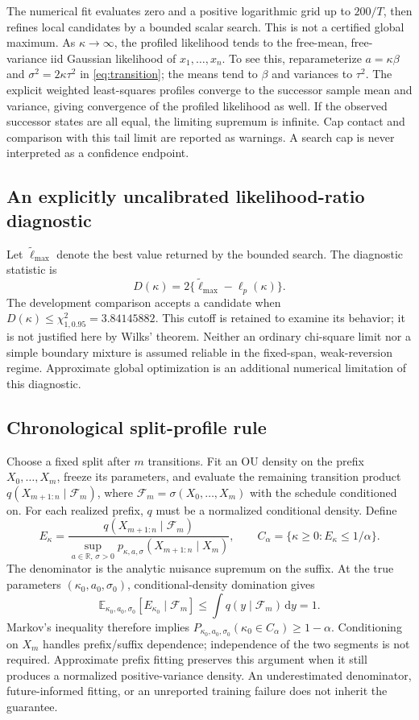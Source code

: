 \documentclass[11pt]{article}
\newcommand{\E}{\mathbb E}
\newcommand{\R}{\mathbb R}
\newcommand{\D}{\mathrm d}
\begin{document}
The numerical fit evaluates zero and a positive logarithmic grid up to $200/T$, then refines
local candidates by a bounded scalar search. This is not a certified global
maximum. As $\kappa\to\infty$, the profiled likelihood tends to the free-mean,
free-variance iid Gaussian likelihood of $x_1,\ldots,x_n$. To see this,
reparameterize $a=\kappa\beta$ and $\sigma^2=2\kappa\tau^2$ in
\eqref{eq:transition}; the means tend to $\beta$ and variances to $\tau^2$.
The explicit weighted least-squares profiles converge to the successor sample
mean and variance, giving convergence of the profiled likelihood as well.
If the observed successor states are all equal, the limiting supremum is
infinite. Cap contact and comparison with this tail limit are reported as
warnings. A search cap is never interpreted as a confidence endpoint.

\subsection{An explicitly uncalibrated likelihood-ratio diagnostic}
Let $\widetilde\ell_{\max}$ denote the best value returned by the bounded
search. The diagnostic statistic is
\[
 D(\kappa)=2\{\widetilde\ell_{\max}-\ell_p(\kappa)\}.
\]
The development comparison accepts a candidate when
$D(\kappa)\leq\chi^2_{1,0.95}=3.84145882$. This cutoff is retained to examine
its behavior; it is not justified here by Wilks' theorem. Neither an ordinary
chi-square limit nor a simple boundary mixture is assumed reliable in the
fixed-span, weak-reversion regime. Approximate global optimization is an
additional numerical limitation of this diagnostic.

\subsection{Chronological split-profile rule}
Choose a fixed split after $m$ transitions. Fit an OU density on the prefix
$X_0,\ldots,X_m$, freeze its parameters, and evaluate the remaining transition
product $q(X_{m+1:n}\mid\mathcal F_m)$, where
$\mathcal F_m=\sigma(X_0,\ldots,X_m)$ with the schedule conditioned on.
For each realized prefix, $q$ must be a normalized conditional density. Define
\begin{equation}
 E_\kappa=
 \frac{q(X_{m+1:n}\mid\mathcal F_m)}
 {\sup_{a\in\R,\,\sigma>0}
 p_{\kappa,a,\sigma}(X_{m+1:n}\mid X_m)},
 \qquad
 C_\alpha=\{\kappa\geq0:E_\kappa\leq1/\alpha\}.
 \label{eq:evalue}
\end{equation}
The denominator is the analytic nuisance supremum on the suffix. At the true
parameters $(\kappa_0,a_0,\sigma_0)$, conditional-density domination gives
\[
 \E_{\kappa_0,a_0,\sigma_0}[E_{\kappa_0}\mid\mathcal F_m]
 \leq\int q(y\mid\mathcal F_m)\,\D y=1.
\]
Markov's inequality therefore implies
$P_{\kappa_0,a_0,\sigma_0}(\kappa_0\in C_\alpha)\geq1-\alpha$.
Conditioning on $X_m$ handles prefix/suffix dependence; independence of the two
segments is not required. Approximate prefix fitting preserves this argument
when it still produces a normalized positive-variance density. An underestimated
denominator, future-informed fitting, or an unreported training failure does
not inherit the guarantee.
\end{document}
